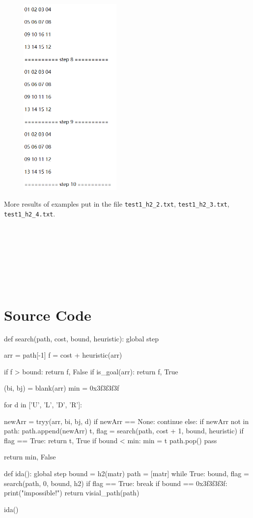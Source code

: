 \documentclass[a4paper, 11pt]{article}
\begin{document}
\begin{figure}[ht]
\includegraphics[width=5cm]{Pic/ex3}
\end{figure}

More results of examples put in the file \texttt{test1\_h2\_2.txt}, \texttt{test1\_h2\_3.txt}, \texttt{test1\_h2\_4.txt}.
\\
\\
\\
\\
\\
\\
\\
\\

\section{Source Code}
\begin{python}
	def search(path, cost, bound, heuristic):
	global step

	arr = path[-1]
	f = cost + heuristic(arr)
	
	if f > bound:
		return f, False
	if is_goal(arr):
		return f, True
	
	(bi, bj) = blank(arr)
	min = 0x3f3f3f3f
	
	for d in ['U', 'L', 'D', 'R']:

		newArr = tryy(arr, bi, bj, d)
		if newArr == None:
			continue
		else:
			if newArr not in path:
				path.append(newArr)
				t, flag = search(path, cost + 1, bound, heuristic)
			if flag == True:
				return t, True
			if bound < min:
				min = t
			path.pop()
		pass
	
	return min, False
	
	
	def ida():
	global step
	bound = h2(matr)
	path = [matr]
	while True:
	bound, flag = search(path, 0, bound, h2)
	if flag == True:
	break
	if bound == 0x3f3f3f3f:
	print("impossible!")
	return
	visial_path(path)

	
	ida()
\end{python}

%
%
\end{document}
